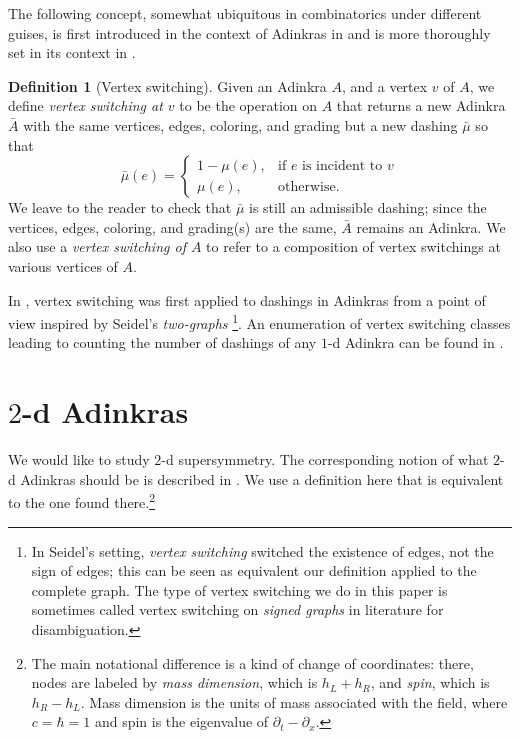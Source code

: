 \documentclass[12pt,twoside,singlespace]{article}
\numberwithin{equation}{section}
\theoremstyle{definition}
\newtheorem{definition}[equation]{Definition}
\begin{document}
The following concept, somewhat ubiquitous in combinatorics under different guises, is first introduced in the context of Adinkras in \cite{d2l:first} and is more thoroughly set in its context in \cite{dil:cohomology,zhang:adinkras}.

\begin{definition}[Vertex switching]
Given an Adinkra $A$, and a vertex $v$ of $A$, we define \emph{vertex switching at $v$} to be the operation on $A$ that returns a new Adinkra $\bar{A}$ with the same vertices, edges, coloring, and grading but a new dashing $\bar{\mu}$ so that
\begin{equation}
\bar{\mu}(e)=\begin{cases}
1-\mu(e),&\mbox{if $e$ is incident to $v$}\\
\mu(e),&\mbox{otherwise.}
\end{cases}
\end{equation}
We leave to the reader to check that $\bar{\mu}$ is still an admissible dashing; since the vertices, edges, coloring, and grading(s) are the same, $\bar{A}$ remains an Adinkra. We also use a \emph{vertex switching of $A$} to refer to a composition of vertex switchings at various vertices of $A$. 
\end{definition}

In \cite{douglas}, vertex switching was first applied to dashings in Adinkras from a point of view inspired by Seidel's \emph{two-graphs} \cite{seidel:survey} \footnote{In Seidel's setting, \emph{vertex switching} switched the existence of edges, not the sign of edges; this can be seen as equivalent our definition applied to the complete graph. The type of vertex switching we do in this paper is sometimes called vertex switching on \emph{signed graphs} in literature for disambiguation.}. An enumeration of vertex switching classes leading to counting the number of dashings of any $1$-d Adinkra can be found in \cite{zhang:adinkras}.

\section{$2$-d Adinkras}
\label{sec:2d}
We would like to study $2$-d supersymmetry. The corresponding notion of what $2$-d Adinkras should be is described in \cite{gates:dimensional_extension,hubsch:weaving}.  We use a definition here that is equivalent to the one found there.\footnote{The main notational difference is a kind of change of coordinates: there, nodes are labeled by \emph{mass dimension}, which is $h_L+h_R$, and \emph{spin}, which is $h_R-h_L$.  Mass dimension is the units of mass associated with the field, where $c=\hbar=1$ and spin is the eigenvalue of $\partial_t-\partial_x$.}
\end{document}
